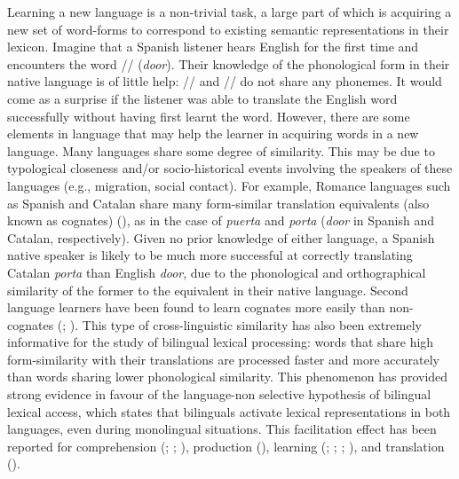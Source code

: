 \documentclass[
]{article}
\begin{document}
Learning a new language is a non-trivial task, a large part of which is
acquiring a new set of word-forms to correspond to existing semantic
representations in their lexicon. Imagine that a Spanish listener hears
English for the first time and encounters the word //
(\emph{door}). Their knowledge of the phonological form in their native
language is of little help: // and // do
not share any phonemes. It would come as a surprise if the listener was
able to translate the English word successfully without having first
learnt the word. However, there are some elements in language that may
help the learner in acquiring words in a new language. Many languages
share some degree of similarity. This may be due to typological
closeness and/or socio-historical events involving the speakers of these
languages (e.g., migration, social contact). For example, Romance
languages such as Spanish and Catalan share many form-similar
translation equivalents (also known as cognates)
(), as in
the case of \emph{puerta} and \emph{porta} (\emph{door} in Spanish and
Catalan, respectively). Given no prior knowledge of either language, a
Spanish native speaker is likely to be much more successful at correctly
translating Catalan \emph{porta} than English \emph{door}, due to the
phonological and orthographical similarity of the former to the
equivalent in their native language. Second language learners have been
found to learn cognates more easily than non-cognates
(;
). This
type of cross-linguistic similarity has also been extremely informative
for the study of bilingual lexical processing: words that share high
form-similarity with their translations are processed faster and more
accurately than words sharing lower phonological similarity. This
phenomenon has provided strong evidence in favour of the language-non
selective hypothesis of bilingual lexical access, which states that
bilinguals activate lexical representations in both languages, even
during monolingual situations. This facilitation effect has been
reported for comprehension (; ;
), production
(), learning
(;
;
;
), and translation
().
\end{document}
